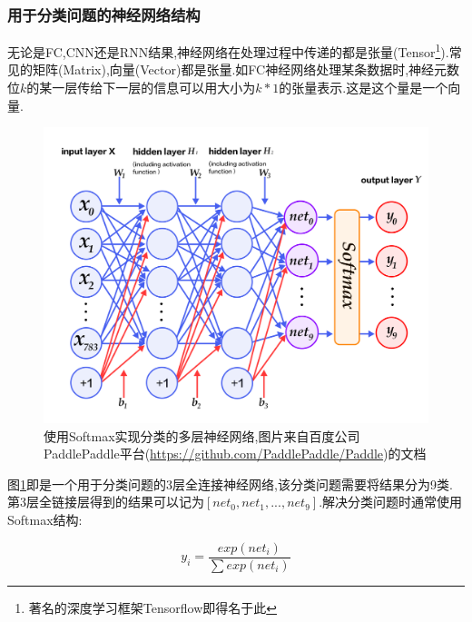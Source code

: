 \subsubsection{用于分类问题的神经网络结构}
\par
无论是FC,CNN还是RNN结果,神经网络在处理过程中传递的都是张量(Tensor\footnote{著名的深度学习框架Tensorflow\supercite{abadi2016tensorflow}即得名于此}).常见的矩阵(Matrix),向量(Vector)都是张量.如FC神经网络处理某条数据时,神经元数位$k$的某一层传给下一层的信息可以用大小为$k*1$的张量表示.这是这个量是一个向量.
\par
\begin{figure}[htbp!]
    \centering
    \includegraphics[width = 1.\textwidth]{chap/img/mlp_paddle.png}
    \caption{
        使用Softmax实现分类的多层神经网络,图片来自百度公司PaddlePaddle平台(\url{https://github.com/PaddlePaddle/Paddle})的文档\supercite{recognize_digits_paddle}
        }\label{fig:mlp_paddle}
\end{figure}
\par
图\ref{fig:mlp_paddle}即是一个用于分类问题的3层全连接神经网络,该分类问题需要将结果分为9类.第3层全链接层得到的结果可以记为$[net_0,net_1,...,net_9]$.解决分类问题时通常使用Softmax结构:
\par
\begin{equation}\label{equ:softmax}  y_i = \frac{exp(net_i)}{\sum{ exp(net_i) }}  \end{equation}
\par

